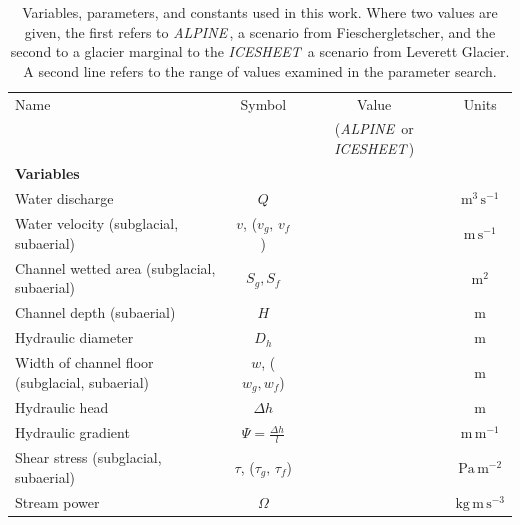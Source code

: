 \documentclass[esurf, manuscript]{copernicus}
\newcommand{\alpine}{\textit{ALPINE}\,}
\newcommand{\icesheet}{\textit{ICESHEET}\,}
\begin{document}
\begin{table}[hbt!]
  \centering
  \caption{Variables, parameters, and constants used in this work.
    Where two values are given, the first refers to  \alpine{}, a scenario from Fieschergletscher, and the second to a glacier marginal to the \icesheet{} a scenario from Leverett Glacier.
    A second line refers to the range of values examined in the parameter search.}
  \small 
  \begin{tabular}{ l  c  c c }
    Name &Symbol&  Value&Units \\
         && (\alpine{} or \icesheet{})\\
    \hline
    \textbf{Variables}  & & & \\
    Water discharge  & $Q$& & $\mathrm{m^{3}\,s^{-1}}$ \\
    Water velocity (subglacial, subaerial)  & $v$, ($v_g,\,v_{f}$)& & $\mathrm{m\,s^{-1}}$ \\
    Channel wetted area (subglacial, subaerial) &  $S_g, S_f$& & $\mathrm{m^2}$     \\
    Channel depth (subaerial) & $H$&& $\mathrm{m}$\\
    Hydraulic diameter &$D_h$&&$\mathrm{m}$\\
    Width of channel floor (subglacial, subaerial) & $w$, ($w_g,w_f$)&  & $\mathrm{m}$     \\
    Hydraulic head &$\Delta h$&& $\mathrm{m}$\\
    Hydraulic gradient &$\Psi=\frac{\Delta h}{l}$&& $\mathrm{m\, m^{-1}}$\\
    Shear stress (subglacial, subaerial) & $\tau$, ($\tau_g,\,\tau_f$) && $\mathrm{Pa \, m^{-2}}$ \\
    Stream power & $\Omega$ && $\mathrm{ kg \, m\, s^{-3}}$ \\



\end{tabular}
\end{table}
\end{document}
